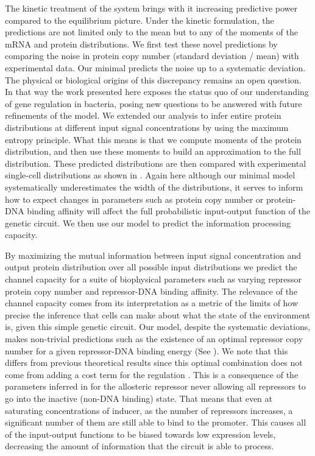 The kinetic treatment of the system brings with it increasing predictive power
compared to the equilibrium picture. Under the kinetic formulation, the
predictions are not limited only to the mean but to any of the moments of the
mRNA and protein distributions. We first test these novel predictions by
comparing the noise in protein copy number (standard deviation / mean) with
experimental data. Our minimal predicts the noise up to a systematic deviation.
The physical or biological origins of this discrepancy remains an open
question. In that way the work presented here exposes the status quo of our
understanding of gene regulation in bacteria, posing new questions to be
answered with future refinements of the model. We extended our analysis to
infer entire protein distributions at different input signal concentrations by
using the maximum entropy principle. What this means is that we compute moments
of the protein distribution, and then use these moments to build an
approximation to the full distribution. These predicted distributions are then
compared with experimental single-cell distributions as shown in
. Again here although our minimal model systematically
underestimates the width of the distributions, it serves to inform how to
expect changes in parameters such as protein copy number or protein-DNA binding
affinity will affect the full probabilistic input-output function of the
genetic circuit. We then use our model to predict the information processing
capacity.

By maximizing the mutual information between input signal concentration and
output protein distribution over all possible input distributions we predict
the channel capacity for a suite of biophysical parameters such as varying
repressor protein copy number and repressor-DNA binding affinity. The relevance
of the channel capacity comes from its interpretation as a metric of the limits
of how precise the inference that cells can make about what the state of the
environment is, given this simple genetic circuit. Our model, despite the
systematic deviations, makes non-trivial predictions such as the
existence of an optimal repressor copy number for a given repressor-DNA binding
energy (See ). We note that this differs from previous
theoretical results since this optimal combination does not come from adding a
cost term for the regulation \cite{Tkacik2011}. This is a consequence of the
parameters inferred in \cite{Razo-Mejia2018} for the allosteric repressor never
allowing all repressors to go into the inactive (non-DNA binding) state. That
means that even at saturating concentrations of inducer, as the number of
repressors increases, a significant number of them are still able to bind to
the promoter. This causes all of the input-output functions to be biased
towards low expression levels, decreasing the amount of information that the
circuit is able to process.

